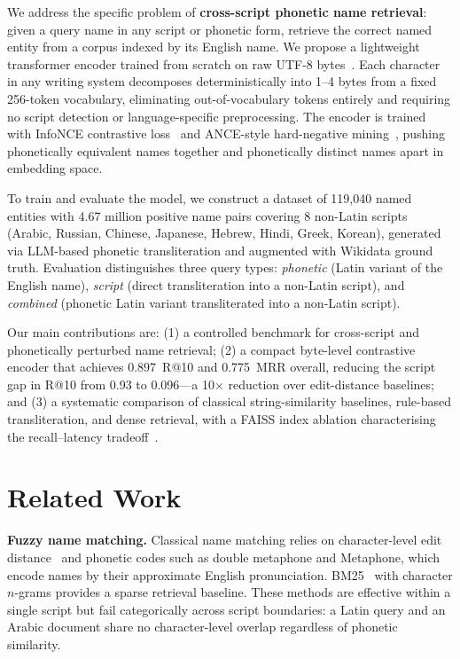 \documentclass[sigconf]{acmart}
\begin{document}
We address the specific problem of \textbf{cross-script phonetic name retrieval}: given a query
name in any script or phonetic form, retrieve the correct named entity from a corpus indexed by
its English name. We propose a lightweight transformer encoder trained from scratch on raw UTF-8
bytes~\cite{xue2022byt5,vaswani2017attention}. Each character in any writing system decomposes
deterministically into 1--4 bytes from a fixed 256-token vocabulary, eliminating out-of-vocabulary
tokens entirely and requiring no script detection or language-specific preprocessing. The encoder
is trained with InfoNCE contrastive loss~\cite{oord2018cpc} and ANCE-style hard-negative
mining~\cite{robinson2021hardneg}, pushing phonetically equivalent names together and
phonetically distinct names apart in embedding space.

To train and evaluate the model, we construct a dataset of 119,040 named entities with 4.67
million positive name pairs covering 8 non-Latin scripts (Arabic, Russian, Chinese, Japanese,
Hebrew, Hindi, Greek, Korean), generated via LLM-based phonetic transliteration and augmented
with Wikidata ground truth. Evaluation distinguishes three query types: \textit{phonetic} (Latin
variant of the English name), \textit{script} (direct transliteration into a non-Latin script),
and \textit{combined} (phonetic Latin variant transliterated into a non-Latin script).

Our main contributions are: (1) a controlled benchmark for cross-script and phonetically perturbed
name retrieval; (2) a compact byte-level contrastive encoder that achieves 0.897~R@10 and 0.775~MRR
overall, reducing the script gap in R@10 from 0.93 to 0.096---a 10$\times$ reduction over
edit-distance baselines; and (3) a systematic comparison of classical string-similarity baselines,
rule-based transliteration, and dense retrieval, with a FAISS index ablation characterising the
recall--latency tradeoff~\cite{johnson2021faiss,malkov2020hnsw}.

\section{Related Work}

\noindent\textbf{Fuzzy name matching.}
Classical name matching relies on character-level edit distance~\cite{levenshtein1966binary,navarro2001guided}
and phonetic codes such as double metaphone and Metaphone, which encode names by their approximate English
pronunciation. BM25~\cite{robertson2009bm25} with character $n$-grams provides a sparse retrieval
baseline. These methods are effective within a single script but fail categorically across script
boundaries: a Latin query and an Arabic document share no character-level overlap regardless of
phonetic similarity.
\end{document}
